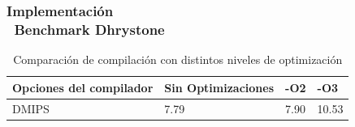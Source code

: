 \documentclass[xcolor=dvipsnames,mathserif,9pt]{beamer}
\begin{document}
\begin{frame} \frametitle{Implementación\\ \ Benchmark Dhrystone}
 
\begin{table}[h!]
\begin{center}
\begin{tabular}{ |l |l |l |l |}
\hline
\rowcolor[gray]{0.8} Opciones del compilador & Sin Optimizaciones & -O2 &-O3 \\
\hline
DMIPS 					& 7.79 			&   7.90  &  10.53  \\
\hline
\end{tabular}
\end{center}
\label{tab:optimiza}
\caption{Comparación de compilación con distintos niveles de optimización}
\end{table}
\end{frame}
\end{document}
